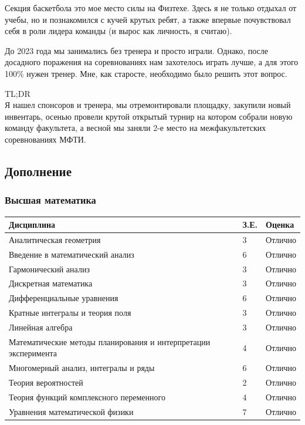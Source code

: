 \documentclass[a4paper,12pt]{article}
\begin{document}
\begin{itemize}
	Секция баскетбола это мое место силы на Физтехе. Здесь я не только отдыхал от учебы, но и познакомился с кучей крутых ребят, а также впервые почувствовал себя в роли лидера команды (и вырос как личность, я считаю).
	
	До 2023 года мы занимались без тренера и просто играли. Однако, после досадного поражения на соревнованиях нам захотелось играть лучше, а для этого 100\% нужен тренер. Мне, как старосте, необходимо было решить этот вопрос. 
	
	TL;DR\\ Я нашел спонсоров и тренера, мы отремонтировали площадку, закупили новый инвентарь, осенью провели крутой открытый турнир на котором собрали новую команду факультета, а весной мы заняли 2-е место на межфакультетских соревнованиях МФТИ.
	
	\end{itemize}
	
	
	
	
	\newpage 
	
	\subsection*{Дополнение}
	
	\subsubsection*{Высшая математика}
	{\fontsize{9}{11}\selectfont
	\begin{tabular}{p{} p{} p{}}
	\toprule
	\textbf{Дисциплина} & \textbf{З.Е.} & \textbf{Оценка} \\
	\midrule
	Аналитическая геометрия & 3 & Отлично \\
	Введение в математический анализ & 6 & Отлично \\
	Гармонический анализ & 3 & Отлично \\
	Дискретная математика & 3 & Отлично \\
	Дифференциальные уравнения & 6 & Отлично \\
	Кратные интегралы и теория поля & 3 & Отлично \\
	Линейная алгебра & 3 & Отлично \\
	Математические методы планирования и интерпретации эксперимента & 4 & Отлично \\
	Многомерный анализ, интегралы и ряды & 6 & Отлично \\
	Теория вероятностей & 2 & Отлично \\
	Теория функций комплексного переменного & 4 & Отлично \\
	Уравнения математической физики & 7 & Отлично \\
	\bottomrule
	\end{tabular}}
	
\end{document}
